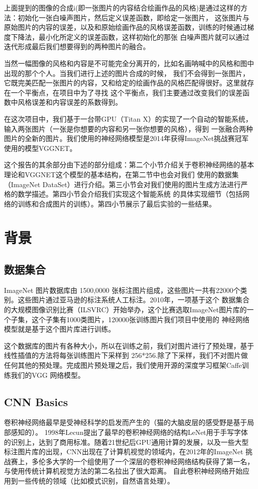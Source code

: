 \documentclass[10pt,a4paper]{ctexart}
\begin{document}
    上面提到的图像的合成i(即一张图片的内容结合绘画作品的风格)是通过这样的方法：初始化一张白噪声图片，然后定义误差函数，即给定一张图片，
    这张图片与原始图片的内容的误差，以及和原始绘画作品的风格误差函数，训练的时候通过梯度下降法，最小化所定义的误差函数，这样初始化的那张
    白噪声图片就可以通过迭代形成最后我们想要得到的两种图片的融合。
	
    当然一幅图像的风格和内容是不可能完全分离开的，比如名画呐喊中的风格和图中出现的那个个人。当我们进行上述的图片合成的时候，
    我们不会得到一张图片，它既完美匹配一张图片的内容，又和给定的绘画作品的风格匹配得很好。这里就存在一个平衡点，在项目中为了寻找
    这个平衡点，我们主要通过改变我们的误差函数中风格误差和内容误差的系数得到。

    在这次项目中，我们基于一台带GPU（Titan X）的实现了一个自动的智能系统，输入两张图片（一张是你想要的内容和另一张你想要的风格），得到
    一张融合两种图片的全新的图片。我们使用的神经网络模型是2014年获得ImageNet挑战赛冠军使用的模型VGGNET。
    
    这个报告的其余部分由下述的部分组成：第二个小节介绍关于卷积神经网络的基本理论和VGGNET这个模型的基本结构，在第二节中也会对我们
    使用的数据集（ImageNet DataSet）进行介绍。第三小节会对我们使用的图片生成方法进行严格的数学描述。第四小节会介绍我们实现这个智能系统
    的具体实现细节（包括网络的训练和合成图片的训练）。第四小节展示了最后实验的一些结果。
	\section{背景}
	\subsection{数据集合}
    ImageNet 图片数据库由 1500,0000 张标注图片组成，这些图片一共有22000个类别。这些图片通过亚马逊的标注系统人工标注。2010年，一项基于这个
    数据集合的大规模图像识别比赛（ILSVRC）开始举办，这个比赛选取ImageNet图片库的一个子集，这个子集有1000类图片，120000张训练图片我们项目中使用的
    神经网络模型就是基于这个图片库进行训练。

    这个数据库的图片有各种大小，所以在训练之前，我们对图片进行了预处理，基于线性插值的方法将每张训练图片下采样到 256*256.除了下采样，我们不对图片做任何其他的预处理。完成图片预处理之后，我们使用开源的深度学习框架Caffe\cite{jia2014caffe}训练我们的VGG 网络模型。
	\subsection{CNN Basics}
    卷积神经网络最早是受神经科学的启发而产生的（猫的大脑皮层的感受野是基于局部感知的）\cite{Hubel1962Receptive}。
    1998年Lecun提出了最早的卷积神经网络的结构LeNet用于手写字体的识别上，达到了商用标准。随着21世纪后GPU通用计算的发展，以及一些大型
    标注图片库的出现，CNN出现在了计算机视觉的领域内，在2012年的ImageNet 挑战赛上，多伦多大学的一个组使用了一个深层的卷积神经网络结构获得了第一名，与使用传统计算机视觉方法的第二名拉出了很大距离。
	自此卷积神经网络开始应用到一些传统的领域（比如模式识别，自然语言处理）。
\end{document}
